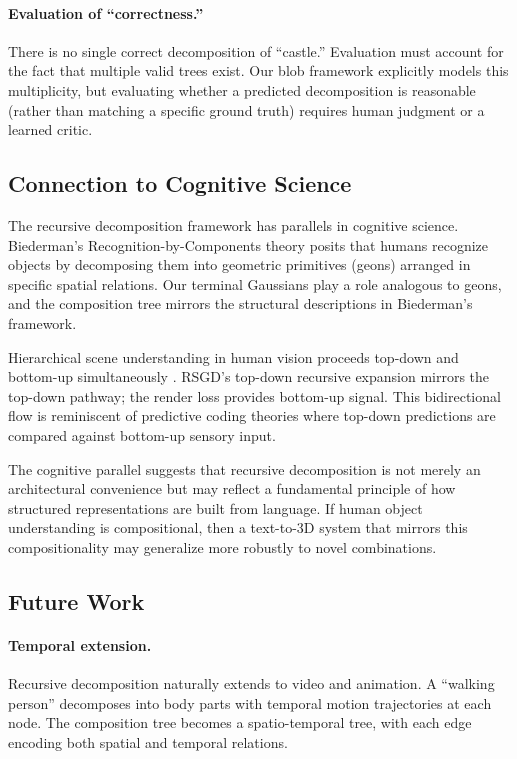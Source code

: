 \documentclass[11pt]{article}
\begin{document}
\paragraph{Evaluation of ``correctness.''} There is no single correct decomposition of ``castle.'' Evaluation must account for the fact that multiple valid trees exist. Our blob framework explicitly models this multiplicity, but evaluating whether a predicted decomposition is reasonable (rather than matching a specific ground truth) requires human judgment or a learned critic.

\subsection{Connection to Cognitive Science}

The recursive decomposition framework has parallels in cognitive science. Biederman's Recognition-by-Components theory \cite{biederman1987} posits that humans recognize objects by decomposing them into geometric primitives (geons) arranged in specific spatial relations. Our terminal Gaussians play a role analogous to geons, and the composition tree mirrors the structural descriptions in Biederman's framework.

Hierarchical scene understanding in human vision proceeds top-down and bottom-up simultaneously \cite{hochstein2002}. RSGD's top-down recursive expansion mirrors the top-down pathway; the render loss provides bottom-up signal. This bidirectional flow is reminiscent of predictive coding theories \cite{rao1999} where top-down predictions are compared against bottom-up sensory input.

The cognitive parallel suggests that recursive decomposition is not merely an architectural convenience but may reflect a fundamental principle of how structured representations are built from language. If human object understanding is compositional, then a text-to-3D system that mirrors this compositionality may generalize more robustly to novel combinations.

\subsection{Future Work}

\paragraph{Temporal extension.} Recursive decomposition naturally extends to video and animation. A ``walking person'' decomposes into body parts with temporal motion trajectories at each node. The composition tree becomes a spatio-temporal tree, with each edge encoding both spatial and temporal relations.
\end{document}
